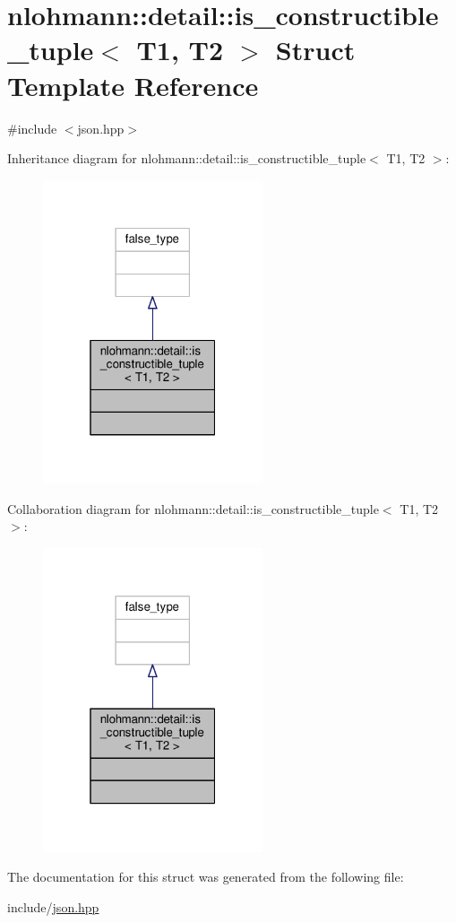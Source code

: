 \hypertarget{structnlohmann_1_1detail_1_1is__constructible__tuple}{}\section{nlohmann\+:\+:detail\+:\+:is\+\_\+constructible\+\_\+tuple$<$ T1, T2 $>$ Struct Template Reference}
\label{structnlohmann_1_1detail_1_1is__constructible__tuple}


{\ttfamily \#include $<$json.\+hpp$>$}



Inheritance diagram for nlohmann\+:\+:detail\+:\+:is\+\_\+constructible\+\_\+tuple$<$ T1, T2 $>$\+:
\nopagebreak
\begin{figure}[H]
\begin{center}
\leavevmode
\includegraphics[width=184pt]{structnlohmann_1_1detail_1_1is__constructible__tuple__inherit__graph}
\end{center}
\end{figure}


Collaboration diagram for nlohmann\+:\+:detail\+:\+:is\+\_\+constructible\+\_\+tuple$<$ T1, T2 $>$\+:
\nopagebreak
\begin{figure}[H]
\begin{center}
\leavevmode
\includegraphics[width=184pt]{structnlohmann_1_1detail_1_1is__constructible__tuple__coll__graph}
\end{center}
\end{figure}


The documentation for this struct was generated from the following file\+:\begin{DoxyCompactItemize}
\item 
include/\hyperlink{json_8hpp}{json.\+hpp}\end{DoxyCompactItemize}
